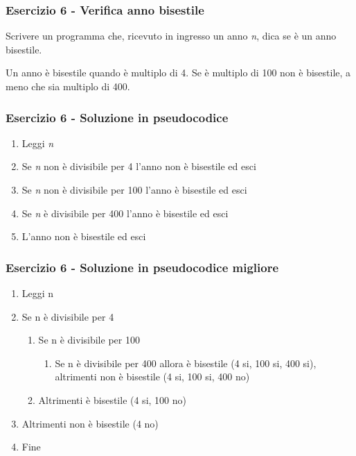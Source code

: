 \documentclass[]{beamer}
\begin{document}
\begin{frame}
\frametitle{Esercizio 6 - Verifica anno bisestile}
Scrivere un programma che, ricevuto in ingresso un anno \emph{n}, dica se è un anno bisestile.

Un anno è bisestile quando è multiplo di 4. Se è multiplo di 100 non è bisestile, a meno che sia multiplo di 400.
\end{frame}

\begin{frame}
\frametitle{Esercizio 6 - Soluzione in pseudocodice}
\begin{enumerate}
	\item Leggi \emph{n}
	\item Se \emph{n} non è divisibile per 4 l'anno \alert{non è} bisestile ed esci
	\item Se \emph{n} non è divisibile per 100 l'anno \alert{è} bisestile ed esci
	\item Se \emph{n} è divisibile per 400 l'anno \alert{è} bisestile ed esci
	\item L'anno \alert{non è} bisestile ed esci 
\end{enumerate}
\end{frame}

\begin{frame}
\frametitle{Esercizio 6 - Soluzione in pseudocodice migliore}
\begin{enumerate}
	\item Leggi n
	\item Se n è divisibile per 4
	\begin{enumerate}
		\item Se n è divisibile per 100
		\begin{enumerate}
			\item Se n è divisibile per 400 allora \alert{è} bisestile (4 si, 100 si, 400 si), altrimenti \alert{non è} bisestile (4 si, 100 si, 400 no)
		\end{enumerate}
		\item Altrimenti \alert{è} bisestile (4 si, 100 no)
	\end{enumerate}
	\item Altrimenti \alert{non è} bisestile (4 no)
	\item Fine
\end{enumerate}
\end{frame}
\end{document}
